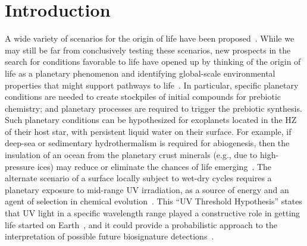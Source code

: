 \documentclass[twocolumn,twocolappendix,linenumbers]{aastex631}
\begin{document}
\section{Introduction}
\label{sec:intro}
A wide variety of scenarios for the origin of life have been proposed~\citep[e.g.,][]{Baross1985,Brasier2011,Mulkidjanian2012,Fox2013,Deamer2015,Westall2018}.
While we may still be far from conclusively testing these scenarios, new prospects in the search for conditions favorable to life have opened up by thinking of the origin of life as a planetary phenomenon and identifying global-scale environmental properties that might support pathways to life~\citep{Sasselov2020}.
In particular, specific planetary conditions are needed to create stockpiles of initial compounds for prebiotic chemistry; and planetary processes are required to trigger the prebiotic synthesis.
Such planetary conditions can be hypothesized for exoplanets located in the \gls{HZ} of their host star, with persistent liquid water on their surface.
For example, if deep-sea or sedimentary hydrothermalism is required for abiogenesis, then the insulation of an ocean from the planetary crust minerals (e.g., due to high-pressure ices) may reduce or eliminate the chances of life emerging~\citep[e.g.,][]{Baross1985}.
The alternate scenario of a surface locally subject to wet-dry cycles requires a planetary exposure to mid-range \gls{UV} irradiation, as a source of energy and an agent of selection in chemical evolution~\citep[e.g.,][]{Deamer2019}.
This “UV Threshold Hypothesis” states that \gls{UV} light in a specific wavelength range played a constructive role in getting life started on Earth~\citep{Ranjan2016,Ranjan2017c,Rimmer2018,Rapf2016}, and it could provide a probabilistic approach to the interpretation of possible future biosignature detections~\citep[e.g.,][]{Catling2018,Walker2018}.
\end{document}

